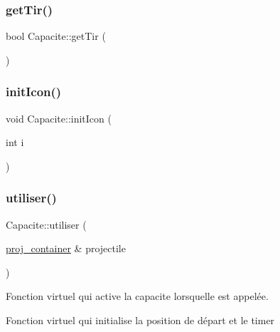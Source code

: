 \mbox{\label{class_capacite_a40152147df357f3c0d9ea1116b0f7241}} 
\subsubsection{\texorpdfstring{get\+Tir()}{getTir()}}
{\footnotesize\ttfamily bool Capacite\+::get\+Tir (\begin{DoxyParamCaption}{ }\end{DoxyParamCaption})\hspace{0.3cm}{\ttfamily [inline]}}

\mbox{\label{class_capacite_aba7e297324570300fe7786dddb8c05ef}} 
\subsubsection{\texorpdfstring{init\+Icon()}{initIcon()}}
{\footnotesize\ttfamily void Capacite\+::init\+Icon (\begin{DoxyParamCaption}\item[{int}]{i }\end{DoxyParamCaption})}

\mbox{\label{class_capacite_abac1434e2ac3ecc9e5afdafd9a7a4bed}} 
\subsubsection{\texorpdfstring{utiliser()}{utiliser()}}
{\footnotesize\ttfamily Capacite\+::utiliser (\begin{DoxyParamCaption}\item[{\mbox{\hyperlink{def__type_8h_a87980cd8ee9533e561a73e8bbc728188}{proj\+\_\+container}} \&}]{projectile }\end{DoxyParamCaption})\hspace{0.3cm}{\ttfamily [pure virtual]}}



Fonction virtuel qui active la capacite lorsqu\textquotesingle{}elle est appelée. 

Fonction virtuel qui initialise la position de départ et le timer 

